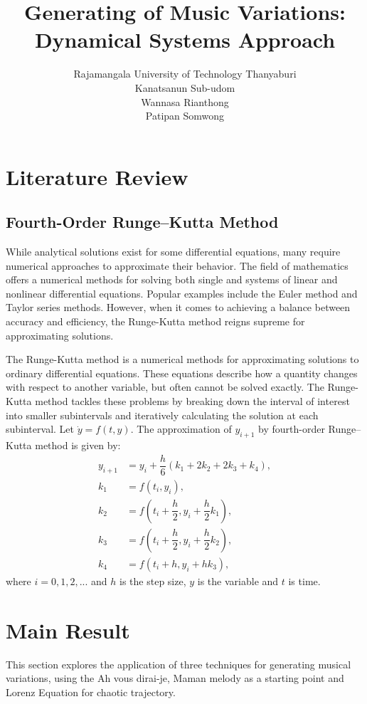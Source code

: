 \documentclass[11pt]{article}
\title{Generating of Music Variations: Dynamical Systems Approach}
\author{Rajamangala University of Technology Thanyaburi\\Kanatsanun Sub-udom\\Wannasa Rianthong\\Patipan Somwong}
\begin{document}
\section{Literature Review}

\subsection{Fourth-Order Runge–Kutta Method}
While analytical solutions exist for some differential equations, many require numerical approaches to approximate their behavior. The field of mathematics offers a numerical methods for solving both single and systems of linear and nonlinear differential equations. Popular examples include the Euler method and Taylor series methods. However, when it comes to achieving a balance between accuracy and efficiency, the Runge-Kutta method reigns supreme for approximating solutions.

The Runge-Kutta method \cite{bose_numerical_2019} is a numerical methods for approximating solutions to ordinary differential equations. These equations describe how a quantity changes with respect to another variable, but often cannot be solved exactly. The Runge-Kutta method tackles these problems by breaking down the interval of interest into smaller subintervals and iteratively calculating the solution at each subinterval. 
Let $\dot{y} = f(t,y)$. The approximation of $y_{i+1}$ by fourth-order Runge–Kutta method is given by:
\begin{align*}
y_{i+1} &= y_i + \dfrac{h}{6}(k_1 + 2k_2 + 2k_3 + k_4), \\
k_1 &= f(t_i, y_i), \\
k_2 &= f\left( t_i + \dfrac{h}{2}, y_i + \dfrac{h}{2}k_1 \right), \\
k_3 &= f\left( t_i + \dfrac{h}{2}, y_i + \dfrac{h}{2}k_2 \right), \\
k_4 &= f(t_i + h, y_i + hk_3),
\end{align*}
\label{fig:RK4}
where $i = 0,1,2,...$ and $h$ is the step size, $y$ is the variable and $t$ is time. \\
\section{Main Result}

This section explores the application of three techniques for generating musical variations, using the Ah vous dirai-je, Maman melody as a starting point and Lorenz Equation for chaotic
trajectory.
\end{document}
